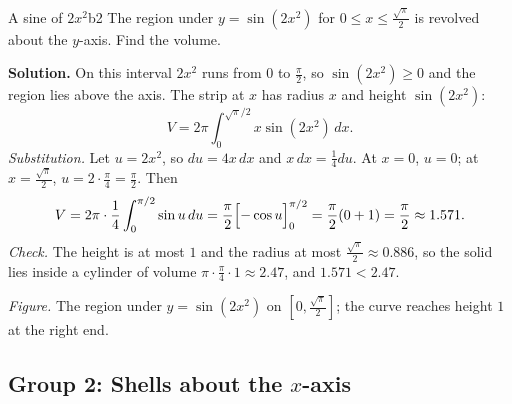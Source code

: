 \documentclass[11pt]{article}
\begin{document}
\begin{exmp}{A sine of $2x^2$}{b2}
The region under $y=\sin(2x^2)$ for $0\le x\le\frac{\sqrt\pi}2$ is revolved about the $y$-axis. Find the volume.

\textbf{Solution.} On this interval $2x^2$ runs from $0$ to $\frac\pi2$, so $\sin(2x^2)\ge0$ and the region lies above the axis. The strip at $x$ has radius $x$ and height $\sin(2x^2)$:
\[
V=2\pi\int_0^{\sqrt\pi/2}x\sin(2x^2)\,dx .
\]
\emph{Substitution.} Let $u=2x^2$, so $du=4x\,dx$ and $x\,dx=\frac14du$. At $x=0$, $u=0$; at $x=\frac{\sqrt\pi}2$, $u=2\cdot\frac\pi4=\frac\pi2$. Then
\[
V=2\pi\cdot\frac14\int_0^{\pi/2}\sin u\,du=\frac\pi2\Bigl[-\cos u\Bigr]_0^{\pi/2}=\frac\pi2(0+1)=\frac\pi2\approx1.571 .
\]
\emph{Check.} The height is at most $1$ and the radius at most $\frac{\sqrt\pi}2\approx0.886$, so the solid lies inside a cylinder of volume $\pi\cdot\frac\pi4\cdot1\approx2.47$, and $1.571<2.47$.
\begin{center}
\par\small\emph{Figure.} The region under $y=\sin(2x^2)$ on $[0,\frac{\sqrt\pi}2]$; the curve reaches height $1$ at the right end.
\end{center}
\end{exmp}

\subsection*{Group 2: Shells about the $x$-axis}
\end{document}
